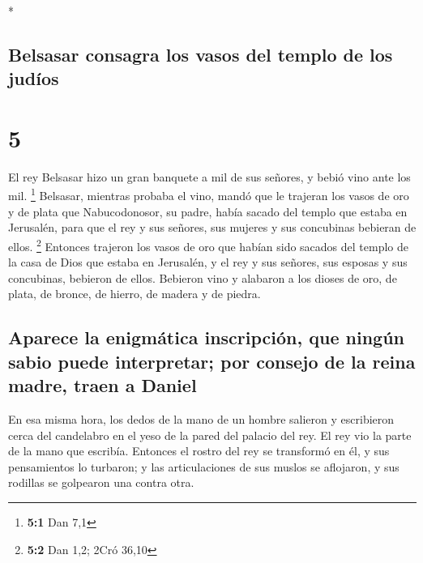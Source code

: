 \begin{paracol}{2}
\begin{otherlanguage}{english}
\end{otherlanguage}

\switchcolumn[0]*

\hypertarget{belsasar-consagra-los-vasos-del-templo-de-los-juduxedos}{%
\subsection{Belsasar consagra los vasos del templo de los
judíos}\label{belsasar-consagra-los-vasos-del-templo-de-los-juduxedos}}

\hypertarget{section-8}{%
\section{5}\label{section-8}}

 El rey Belsasar hizo un gran banquete a mil de sus
señores, y bebió vino ante los mil. \footnote{\textbf{5:1} Dan 7,1}
 Belsasar, mientras probaba el vino, mandó que le trajeran
los vasos de oro y de plata que Nabucodonosor, su padre, había sacado
del templo que estaba en Jerusalén, para que el rey y sus señores, sus
mujeres y sus concubinas bebieran de ellos. \footnote{\textbf{5:2} Dan
  1,2; 2Cró 36,10}  Entonces trajeron los vasos de oro que
habían sido sacados del templo de la casa de Dios que estaba en
Jerusalén, y el rey y sus señores, sus esposas y sus concubinas,
bebieron de ellos.  Bebieron vino y alabaron a los dioses
de oro, de plata, de bronce, de hierro, de madera y de piedra.

\hypertarget{aparece-la-enigmuxe1tica-inscripciuxf3n-que-ninguxfan-sabio-puede-interpretar-por-consejo-de-la-reina-madre-traen-a-daniel}{%
\subsection{Aparece la enigmática inscripción, que ningún sabio puede
interpretar; por consejo de la reina madre, traen a
Daniel}\label{aparece-la-enigmuxe1tica-inscripciuxf3n-que-ninguxfan-sabio-puede-interpretar-por-consejo-de-la-reina-madre-traen-a-daniel}}

 En esa misma hora, los dedos de la mano de un hombre
salieron y escribieron cerca del candelabro en el yeso de la pared del
palacio del rey. El rey vio la parte de la mano que escribía.
 Entonces el rostro del rey se transformó en él, y sus
pensamientos lo turbaron; y las articulaciones de sus muslos se
aflojaron, y sus rodillas se golpearon una contra otra.


\end{paracol}
